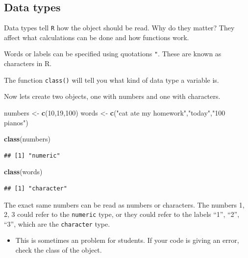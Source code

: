 \documentclass[
]{book}
\newenvironment{Shaded}{\begin{snugshade}}{\end{snugshade}}
\newcommand{\DecValTok}[1]{\textcolor[rgb]{0.00,0.00,0.81}{#1}}
\newcommand{\FunctionTok}[1]{\textcolor[rgb]{0.13,0.29,0.53}{\textbf{#1}}}
\newcommand{\NormalTok}[1]{#1}
\newcommand{\OtherTok}[1]{\textcolor[rgb]{0.56,0.35,0.01}{#1}}
\newcommand{\StringTok}[1]{\textcolor[rgb]{0.31,0.60,0.02}{#1}}
\providecommand{\tightlist}{%
  \setlength{\itemsep}{0pt}\setlength{\parskip}{0pt}}
\begin{document}
\subsection*{Data types}\label{data-types}

Data types tell \texttt{R} how the object should be read. Why do they matter? They affect what calculations can be done and how functions work.

Words or labels can be specified using quotations \texttt{"}. These are known as characters in R.

The function \texttt{class()} will tell you what kind of data type a variable is.

Now lets create two objects, one with numbers and one with characters.

\begin{Shaded}
\begin{Highlighting}[]
\NormalTok{numbers }\OtherTok{\textless{}{-}} \FunctionTok{c}\NormalTok{(}\DecValTok{10}\NormalTok{,}\DecValTok{19}\NormalTok{,}\DecValTok{100}\NormalTok{)}
\NormalTok{words }\OtherTok{\textless{}{-}} \FunctionTok{c}\NormalTok{(}\StringTok{"cat ate my homework"}\NormalTok{,}\StringTok{"today"}\NormalTok{,}\StringTok{"100 pianos"}\NormalTok{)}

\FunctionTok{class}\NormalTok{(numbers)}
\end{Highlighting}
\end{Shaded}

\begin{verbatim}
## [1] "numeric"
\end{verbatim}

\begin{Shaded}
\begin{Highlighting}[]
\FunctionTok{class}\NormalTok{(words)}
\end{Highlighting}
\end{Shaded}

\begin{verbatim}
## [1] "character"
\end{verbatim}

The exact same numbers can be read as numbers or characters. The numbers 1, 2, 3 could refer to the \texttt{numeric} type, or they could refer to the labels ``1'', ``2'', ``3'', which are the \texttt{character} type.

\begin{itemize}
\tightlist
\item
  This is sometimes an problem for students. If your code is giving an error, check the class of the object.
\end{itemize}
\end{document}
